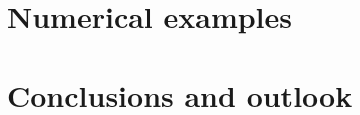\documentclass[10pt,a4paper]{article}
\newcommand{\ded}{\mathrm{d}}
\newcommand{\dep}{\mathrm{p}}
\begin{document}


\section{Numerical examples}\label{sec:examples}

\section{Conclusions and outlook}\label{sec:conlusions}
\end{document}
